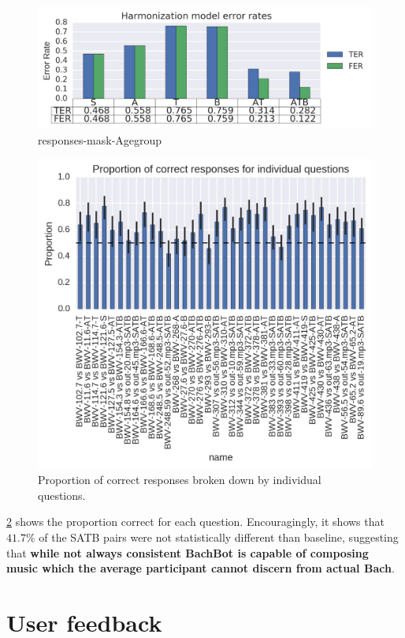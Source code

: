 \begin{figure}[htpb]
  \centering
  \includegraphics[width=1.0\textwidth]{responses-mask-agegroup.png}
  \caption{responses-mask-Agegroup}
  \label{fig:responses-mask-agegroup}
\end{figure}

\begin{figure}[htpb]
  \centering
  \includegraphics[width=0.8\linewidth]{responses-name.png}
  \caption{Proportion of correct responses broken down by individual questions.}
  \label{fig:responses-name}
\end{figure}

\cref{fig:responses-name} shows the proportion correct for each question.
Encouragingly, it shows that $41.7\%$ of the SATB pairs were not
statistically different than baseline, suggesting that \textbf{while not always
consistent BachBot is capable of composing music which the average participant
cannot discern from actual Bach}.


\section{User feedback}

